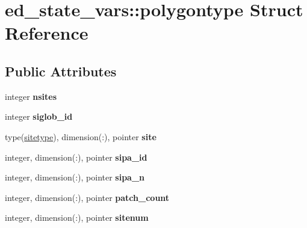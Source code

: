 \hypertarget{structed__state__vars_1_1polygontype}{
\section{ed\_\-state\_\-vars::polygontype Struct Reference}
\label{structed__state__vars_1_1polygontype}
}
\subsection*{Public Attributes}
\begin{DoxyCompactItemize}
\item 
\hypertarget{structed__state__vars_1_1polygontype_a34ce3617f422a8a41500a0d0c771605d}{
integer {\bfseries nsites}}
\label{structed__state__vars_1_1polygontype_a34ce3617f422a8a41500a0d0c771605d}

\item 
\hypertarget{structed__state__vars_1_1polygontype_a2637538336203cb4eda18c31331df88d}{
integer {\bfseries siglob\_\-id}}
\label{structed__state__vars_1_1polygontype_a2637538336203cb4eda18c31331df88d}

\item 
\hypertarget{structed__state__vars_1_1polygontype_a900b303a72ef59302d6894728270032b}{
type(\hyperlink{structed__state__vars_1_1sitetype}{sitetype}), dimension(:), pointer {\bfseries site}}
\label{structed__state__vars_1_1polygontype_a900b303a72ef59302d6894728270032b}

\item 
\hypertarget{structed__state__vars_1_1polygontype_a6b36efe0c2cf37c39b42186b2fc3c515}{
integer, dimension(:), pointer {\bfseries sipa\_\-id}}
\label{structed__state__vars_1_1polygontype_a6b36efe0c2cf37c39b42186b2fc3c515}

\item 
\hypertarget{structed__state__vars_1_1polygontype_a01a6dbea8eaaeedb747be1272d278d79}{
integer, dimension(:), pointer {\bfseries sipa\_\-n}}
\label{structed__state__vars_1_1polygontype_a01a6dbea8eaaeedb747be1272d278d79}

\item 
\hypertarget{structed__state__vars_1_1polygontype_aeac7bebd76daa00b3cb0bed79a74be8d}{
integer, dimension(:), pointer {\bfseries patch\_\-count}}
\label{structed__state__vars_1_1polygontype_aeac7bebd76daa00b3cb0bed79a74be8d}

\item 
\hypertarget{structed__state__vars_1_1polygontype_a929c76a87eb134108c8b700520f362bd}{
integer, dimension(:), pointer {\bfseries sitenum}}
\label{structed__state__vars_1_1polygontype_a929c76a87eb134108c8b700520f362bd}


\end{DoxyCompactItemize}
